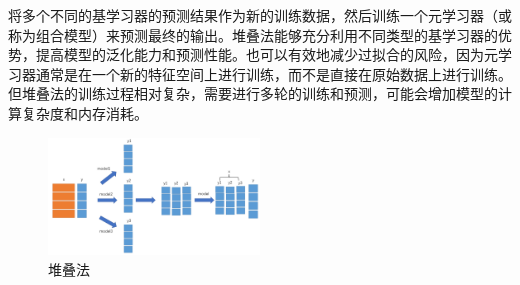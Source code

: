\documentclass[UTF8]{ctexart}
\begin{document}
\begin{enumerate}
  将多个不同的基学习器的预测结果作为新的训练数据，然后训练一个元学习器（或称为组合模型）来预测最终的输出。堆叠法能够充分利用不同类型的基学习器的优势，提高模型的泛化能力和预测性能。也可以有效地减少过拟合的风险，因为元学习器通常是在一个新的特征空间上进行训练，而不是直接在原始数据上进行训练。但堆叠法的训练过程相对复杂，需要进行多轮的训练和预测，可能会增加模型的计算复杂度和内存消耗。
  \begin{figure}[!ht]
    \centering
    \includegraphics[width=0.5\textwidth]{stacking.png}
    \caption{堆叠法}
    \label{fig:stacking}
  \end{figure}
\end{enumerate}
\end{document}
